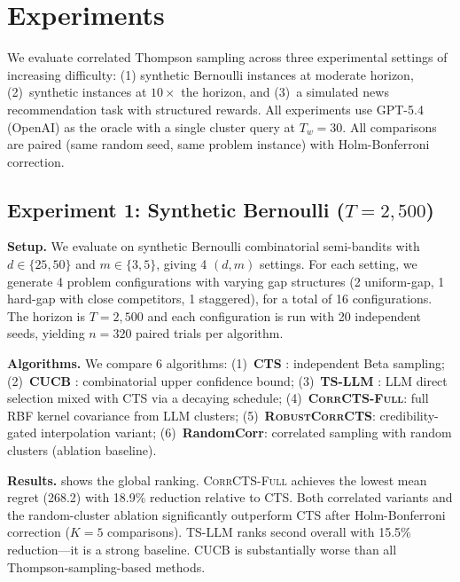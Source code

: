 \documentclass{article}
\theoremstyle{plain}
\theoremstyle{definition}
\theoremstyle{remark}
\newcommand{\CorrFull}{\textsc{CorrCTS-Full}}
\newcommand{\RobustCorr}{\textsc{RobustCorrCTS}}
\begin{document}
\section{Experiments}\label{sec:experiments}

We evaluate correlated Thompson sampling across three experimental settings of increasing difficulty: (1) synthetic Bernoulli instances at moderate horizon, (2)~synthetic instances at $10\times$ the horizon, and (3)~a simulated news recommendation task with structured rewards.
All experiments use GPT-5.4 (OpenAI) as the oracle with a single cluster query at $T_w = 30$.
All comparisons are paired (same random seed, same problem instance) with Holm-Bonferroni correction.

\subsection{Experiment 1: Synthetic Bernoulli ($T{=}2{,}500$)}\label{sec:exp1}

\textbf{Setup.}
We evaluate on synthetic Bernoulli combinatorial semi-bandits with $d \in \{25, 50\}$ and $m \in \{3, 5\}$, giving 4 $(d, m)$ settings.
For each setting, we generate 4 problem configurations with varying gap structures (2 uniform-gap, 1 hard-gap with close competitors, 1 staggered), for a total of 16 configurations.
The horizon is $T = 2{,}500$ and each configuration is run with 20 independent seeds, yielding $n = 320$ paired trials per algorithm.

\textbf{Algorithms.}
We compare 6 algorithms:
(1)~\textbf{CTS} \citep{wang2018cts}: independent Beta sampling;
(2)~\textbf{CUCB} \citep{chen2013cucb}: combinatorial upper confidence bound;
(3)~\textbf{TS-LLM} \citep{sun2025tsllm}: LLM direct selection mixed with CTS via a decaying schedule;
(4)~\textbf{\CorrFull{}}: full RBF kernel covariance from LLM clusters;
(5)~\textbf{\RobustCorr{}}: credibility-gated interpolation variant;
(6)~\textbf{RandomCorr}: correlated sampling with random clusters (ablation baseline).

\textbf{Results.}
 shows the global ranking.
\CorrFull{} achieves the lowest mean regret (268.2) with 18.9\% reduction relative to CTS.
Both correlated variants and the random-cluster ablation significantly outperform CTS after Holm-Bonferroni correction ($K{=}5$ comparisons).
TS-LLM \citep{sun2025tsllm} ranks second overall with 15.5\% reduction---it is a strong baseline.
CUCB is substantially worse than all Thompson-sampling-based methods.
\end{document}
